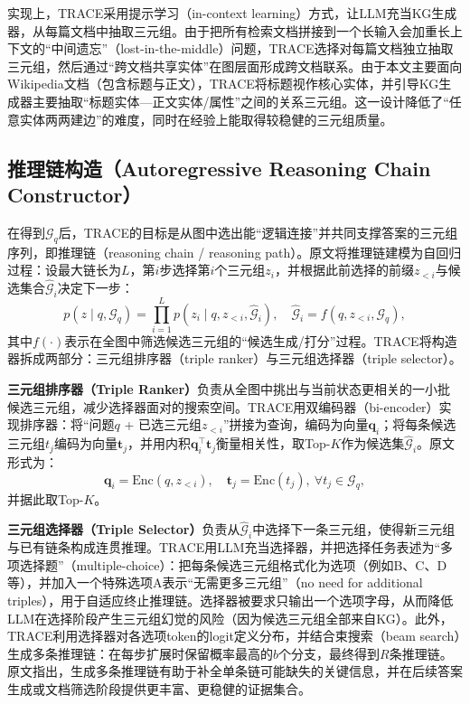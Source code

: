 实现上，TRACE采用提示学习（in-context learning）方式，让LLM充当KG生成器，从每篇文档中抽取三元组。由于把所有检索文档拼接到一个长输入会加重长上下文的“中间遗忘”（lost-in-the-middle）问题，TRACE选择对每篇文档独立抽取三元组，然后通过“跨文档共享实体”在图层面形成跨文档联系。由于本文主要面向Wikipedia文档（包含标题与正文），TRACE将标题视作核心实体，并引导KG生成器主要抽取“标题实体—正文实体/属性”之间的关系三元组。这一设计降低了“任意实体两两建边”的难度，同时在经验上能取得较稳健的三元组质量。

\subsection{推理链构造（Autoregressive Reasoning Chain Constructor）}
在得到$\mathcal{G}_q$后，TRACE的目标是从图中选出能“逻辑连接”并共同支撑答案的三元组序列，即推理链（reasoning chain / reasoning path）。原文将推理链建模为自回归过程：设最大链长为$L$，第$i$步选择第$i$个三元组$z_i$，并根据此前选择的前缀$z_{<i}$与候选集合$\hat{\mathcal{G}}_i$决定下一步：
\[
p(z\mid q,\mathcal{G}_q)=\prod_{i=1}^{L}p(z_i\mid q,z_{<i},\hat{\mathcal{G}}_i),\quad
\hat{\mathcal{G}}_i=f(q,z_{<i},\mathcal{G}_q),
\]
其中$f(\cdot)$表示在全图中筛选候选三元组的“候选生成/打分”过程。TRACE将构造器拆成两部分：三元组排序器（triple ranker）与三元组选择器（triple selector）。

\textbf{三元组排序器（Triple Ranker）}负责从全图中挑出与当前状态更相关的一小批候选三元组，减少选择器面对的搜索空间。TRACE用双编码器（bi-encoder）实现排序器：将“问题$q$ + 已选三元组$z_{<i}$”拼接为查询，编码为向量$\mathbf{q}_i$；将每条候选三元组$t_j$编码为向量$\mathbf{t}_j$，并用内积$\mathbf{q}_i^\top\mathbf{t}_j$衡量相关性，取Top-$K$作为候选集$\hat{\mathcal{G}}_i$。原文形式为：
\[
\mathbf{q}_i=\text{Enc}(q,z_{<i}),\quad \mathbf{t}_j=\text{Enc}(t_j),\ \forall t_j\in\mathcal{G}_q,
\]
并据此取Top-$K$。

\textbf{三元组选择器（Triple Selector）}负责从$\hat{\mathcal{G}}_i$中选择下一条三元组，使得新三元组与已有链条构成连贯推理。TRACE用LLM充当选择器，并把选择任务表述为“多项选择题”（multiple-choice）：把每条候选三元组格式化为选项（例如B、C、D等），并加入一个特殊选项A表示“无需更多三元组”（no need for additional triples），用于自适应终止推理链。选择器被要求只输出一个选项字母，从而降低LLM在选择阶段产生三元组幻觉的风险（因为候选三元组全部来自KG）。此外，TRACE利用选择器对各选项token的logit定义分布，并结合束搜索（beam search）生成多条推理链：在每步扩展时保留概率最高的$b$个分支，最终得到$R$条推理链。原文指出，生成多条推理链有助于补全单条链可能缺失的关键信息，并在后续答案生成或文档筛选阶段提供更丰富、更稳健的证据集合。

